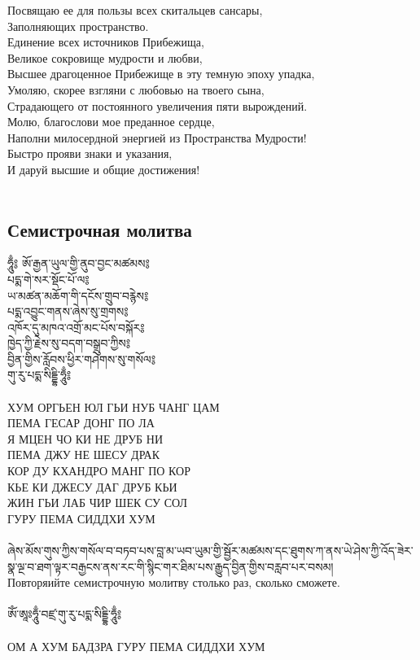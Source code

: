 Посвящаю ее для пользы всех скитальцев сансары, \\
Заполняющих пространство. \\
Единение всех источников Прибежища, \\
Великое сокровище мудрости и любви, \\
Высшее драгоценное Прибежище в эту темную эпоху упадка, \\
Умоляю, скорее взгляни с любовью на твоего сына, \\
Страдающего от постоянного увеличения пяти вырождений. \\
Молю, благослови мое преданное сердце, \\
Наполни милосердной энергией из Пространства Мудрости! \\
Быстро прояви знаки и указания, \\
И даруй высшие и общие достижения! \\
\\
\newpage
\subsection{Семистрочная молитва}

\ti ཧཱུྃ༔ ཨོ་རྒྱན་ཡུལ་གྱི་ནུབ་བྱང་མཚམས༔\\
པདྨ་གེ་སར་སྡོང་པོ་ལ༔\\
ཡ་མཚན་མཆོག་གི་དངོས་གྲུབ་བརྙེས༔\\
པདྨ་འབྱུང་གནས་ཞེས་སུ་གྲགས༔\\
འཁོར་དུ་མཁའ་འགྲོ་མང་པོས་བསྐོར༔\\
ཁྱེད་ཀྱི་རྗེས་སུ་བདག་བསྒྲུབ་ཀྱིས༔\\
བྱིན་གྱིས་རློབས་ཕྱིར་གཤེགས་སུ་གསོལ༔\\
གུ་རུ་པདྨ་སིདྡྷི་ཧཱུྃ༔\\
\\
\ru
ХУМ ОРГЬЕН ЮЛ ГЬИ НУБ ЧАНГ ЦАМ \\
ПЕМА ГЕСАР ДОНГ ПО ЛА \\
Я МЦЕН ЧО КИ НЕ ДРУБ НИ \\
ПЕМА ДЖУ НЕ ШЕСУ ДРАК \\
КОР ДУ КХАНДРО МАНГ ПО КОР \\
КЬЕ КИ ДЖЕСУ ДАГ ДРУБ КЬИ \\
ЖИН ГЬИ ЛАБ ЧИР ШЕК СУ СОЛ\\
ГУРУ ПЕМА СИДДХИ ХУМ\\
\\
\scriptsize
\ti
ཞེས་མོས་གུས་ཀྱིས་གསོལ་བ་བཏབ་པས་བླ་མ་ཡབ་ཡུམ་གྱི་སྦྱོར་མཚམས་དང་ཐུགས་ཀ་ནས་ཡེ་ཤེས་ཀྱི་འོད་ཟེར་སྣ་ལྔ་བ་ཐག་ལྟར་བརྒྱངས་ནས་རང་གི་སྙིང་གར་ཐིམ་པས་རྒྱུད་བྱིན་གྱིས་བརླབ་པར་བསམ།\\
\ru
Повторяийте семистрочную молитву столько раз, сколько сможете.\\
\normalsize
\\
\ti
ཨོཾ་ཨཱཿཧཱུྃ་བཛྲ་གུ་རུ་པདྨ་སིདྡྷི་ཧཱུྃ༔\\
\\
\ru
ОМ А ХУМ БАДЗРА ГУРУ ПЕМА СИДДХИ ХУМ\\
\\
\newpage
